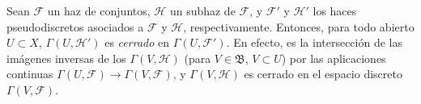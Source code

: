 \begin{env}[3.8.3]
\label{0.3.8.3-fr}
Sean $\mathcal{F}$ un haz de conjuntos, $\mathcal{H}$ un subhaz de
$\mathcal{F}$, y $\mathcal{F}'$ y $\mathcal{H}'$ los haces pseudodiscretos
asociados a $\mathcal{F}$ y $\mathcal{H}$, respectivamente. Entonces, para
todo abierto $U\subset X$, $\Gamma(U,\mathcal{H}')$ es \emph{cerrado} en
$\Gamma(U,\mathcal{F}')$. En efecto, es la intersección de las imágenes
inversas de los $\Gamma(V,\mathcal{H})$ (para $V\in\mathfrak{B}$,
$V\subset U$) por las aplicaciones continuas
$\Gamma(U,\mathcal{F})\to\Gamma(V,\mathcal{F})$, y
$\Gamma(V,\mathcal{H})$ es cerrado en el espacio discreto
$\Gamma(V,\mathcal{F})$.
\end{env}
